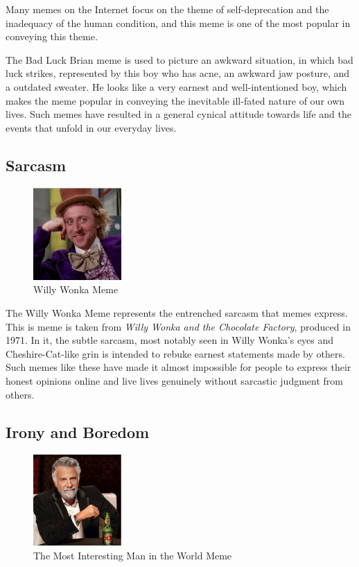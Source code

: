 \documentclass[12pt,letterpaper]{article}
\begin{document}
Many memes on the Internet focus on the theme of self-deprecation and the inadequacy of the human condition, and this meme is one of the most popular in conveying this theme.

The Bad Luck Brian meme is used to picture an awkward situation, in which bad luck strikes, represented by this boy who has acne, an awkward jaw posture, and a outdated sweater.  He looks like a very earnest and well-intentioned boy, which makes the meme popular in conveying the inevitable ill-fated nature of our own lives.  Such memes have resulted in a general cynical attitude towards life and the events that unfold in our  everyday lives.

\subsection{Sarcasm}

\begin{figure}[!h]
	\centering
	\includegraphics[width=0.3\textwidth]{graphics/10}
	\caption{Willy Wonka Meme}
	\label{3}
\end{figure}

The Willy Wonka Meme represents the entrenched sarcasm that memes express.  This is meme is taken from \textit{Willy Wonka and the Chocolate Factory}, produced in 1971. In it, the subtle sarcasm, most notably seen in Willy Wonka's eyes and Cheshire-Cat-like grin is intended to rebuke earnest statements made by others.  Such memes like these have made it almost impossible for people to express their honest opinions online and live lives genuinely without sarcastic judgment from others.

\subsection{Irony and Boredom}

\begin{figure}[!h]
	\centering
	\includegraphics[width=0.3\textwidth]{graphics/9}
	\caption{The Most Interesting Man in the World Meme}
	\label{4}
\end{figure}
\end{document}
